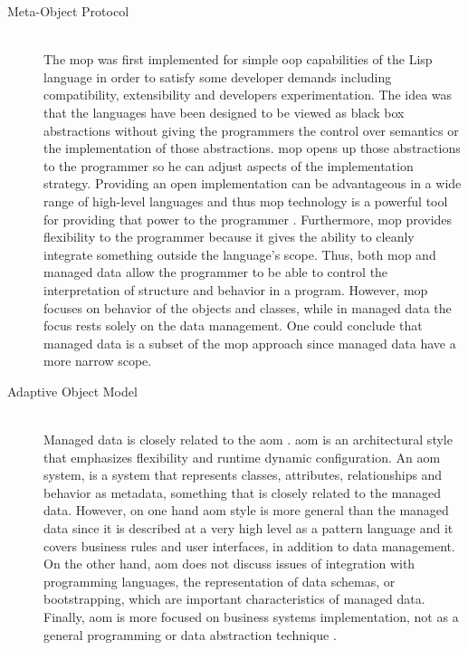 \begin{description}

  \item[Meta-Object Protocol]~\\
  The \ac{mop} \cite{kiczales1991art} was first implemented for simple \ac{oop} capabilities of the Lisp language in order to satisfy some developer demands including compatibility, extensibility and developers experimentation. 
  The idea was that the languages have been designed to be viewed as black box abstractions without giving the programmers the control over semantics or the implementation of those abstractions. 
  \ac{mop} opens up those abstractions to the programmer so he can adjust aspects of the implementation strategy. 
  Providing an open implementation can be advantageous in a wide range of high-level languages and thus \ac{mop} technology is a powerful tool for providing that power to the programmer \cite{kiczales1991art}.
  Furthermore, \ac{mop} provides flexibility to the programmer because it gives the ability to cleanly integrate something outside the language's scope. 
  Thus, both \ac{mop} and managed data allow the programmer to be able to control the interpretation of structure and behavior in a program.
  However, \ac{mop} focuses on behavior of the objects and classes, while in managed data the focus rests solely on the data management.
  One could conclude that managed data is a subset of the \ac{mop} approach since managed data have a more narrow scope.

  \item[Adaptive Object Model]~\\
  Managed data \cite{loh2012managed} is closely related to the \ac{aom} \cite{yoder2002adaptive}. 
  \ac{aom} is an architectural style that emphasizes flexibility and runtime dynamic configuration. 
  An \ac{aom} system, is a system that represents classes, attributes, relationships and behavior as metadata, something that is closely related to the managed data.
  However, on one hand \ac{aom} style is more general than the managed data since it is described at a very high level as a pattern language and it covers business rules and user interfaces, in addition to data management. 
  On the other hand, \ac{aom} does not discuss issues of integration with programming languages, the representation of data schemas, or bootstrapping, which are important characteristics of managed data. 
  Finally, \ac{aom} is more focused on business systems implementation, not as a general programming or data abstraction technique \cite{loh2012managed}.


\end{description}
